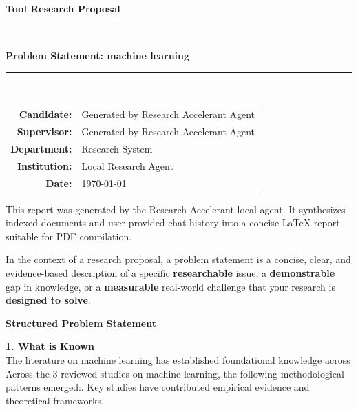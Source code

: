 \documentclass[11pt,a4paper]{article}
\newcommand{\hr}{\rule{\linewidth}{0.5mm}}
\newcommand{\projecttitle}{Problem Statement: machine learning}
\newcommand{\candidate}{Generated by Research Accelerant Agent}
\newcommand{\supervisor}{Generated by Research Accelerant Agent}
\newcommand{\institution}{Local Research Agent}
\newcommand{\department}{Research System}
\newcommand{\dateprep}{\today}
\begin{document}
\thispagestyle{empty}
\begin{center}
    \vspace*{0.5cm}
    {\large \textbf{Tool Research Proposal}}\\[0.5cm]
    \hr\\[0.4cm]
    {\huge \bfseries \color{unalblue} \projecttitle}\\[0.4cm]
    \hr\\[1.2cm]

    \begin{tabular}{rl}
        \textbf{Candidate:} & \candidate \\ 
        \textbf{Supervisor:} & \supervisor \\ 
        \textbf{Department:} & \department \\ 
        \textbf{Institution:} & \institution \\ 
        \textbf{Date:} & \dateprep
    \end{tabular}
    \vspace{1.2cm}

    \begin{tcolorbox}[colback=boxbg, colframe=unalblue, title=Abstract, fonttitle=\bfseries]
        This report was generated by the Research Accelerant local agent. It synthesizes indexed documents and user-provided chat history into a concise LaTeX report suitable for PDF compilation.
    \end{tcolorbox}
\end{center}
\vfill
\clearpage

\tableofcontents
\clearpage




\begin{resultbox}[Definition]
In the context of a research proposal, a problem statement is a concise, clear, and evidence-based description of a specific \textbf{researchable} issue, a \textbf{demonstrable} gap in knowledge, or a \textbf{measurable} real-world challenge that your research is \textbf{designed to solve}.
\end{resultbox}

\vspace{1em}

\textbf{\large Structured Problem Statement}\par\vspace{0.5em}

\textbf{1. What is Known}\\
The literature on machine learning has established foundational knowledge across Across the 3 reviewed studies on machine learning, the following methodological patterns emerged:. Key studies have contributed empirical evidence and theoretical frameworks.
\end{document}
